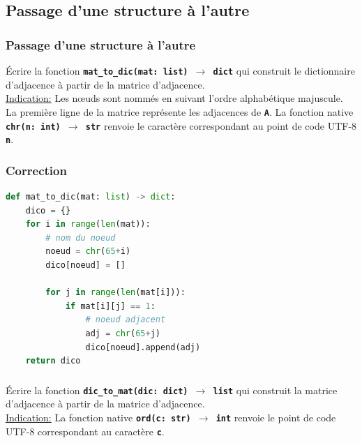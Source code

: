 \documentclass[svgnames,11pt]{beamer}
\begin{document}
\subsection{Passage d'une structure à l'autre}
\begin{frame}
    \frametitle{Passage d'une structure à l'autre}

    \begin{activite}
    Écrire la fonction \textbf{\texttt{mat\_to\_dic(mat: list) $\rightarrow$ dict}} qui construit le dictionnaire d'adjacence à partir de la matrice d'adjacence.\\\underline{Indication:} Les nœuds sont nommés en suivant l'ordre alphabétique majuscule. La première ligne de la matrice représente les adjacences de \textbf{\texttt{A}}. La fonction native \textbf{\texttt{chr(n: int) $\rightarrow$ str}} renvoie le caractère correspondant au point de code UTF-8 \textbf{\texttt{n}}.
    \end{activite}

\end{frame}
\begin{frame}[fragile]
    \frametitle{Correction}

\begin{center}
\begin{lstlisting}[language=Python , basicstyle=\ttfamily\small, xleftmargin=2em, xrightmargin=2em]
def mat_to_dic(mat: list) -> dict:
    dico = {}
    for i in range(len(mat)): 
        # nom du noeud
        noeud = chr(65+i)
        dico[noeud] = []

        for j in range(len(mat[i])):
            if mat[i][j] == 1:
                # noeud adjacent
                adj = chr(65+j)
                dico[noeud].append(adj)
    return dico
\end{lstlisting}
\end{center} 

\end{frame}
\begin{frame}
    \frametitle{}

    \begin{activite}
    Écrire la fonction \textbf{\texttt{dic\_to\_mat(dic: dict) $\rightarrow$ list}} qui construit la matrice d'adjacence à partir de la matrice d'adjacence. \\\underline{Indication:} La fonction native \textbf{\texttt{ord(c: str) $\rightarrow$ int}} renvoie le point de code UTF-8 correspondant au caractère \textbf{\texttt{c}}.
    \end{activite}

\end{frame}
\end{document}
